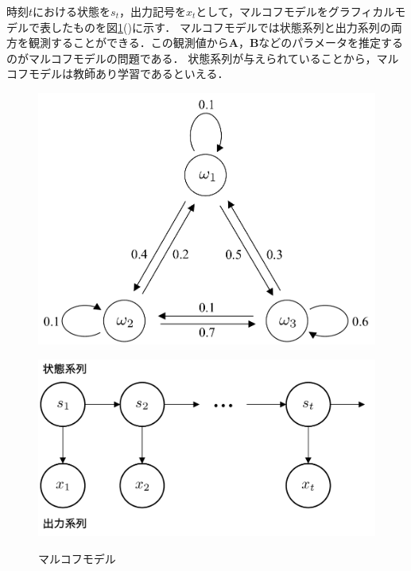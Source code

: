 \documentclass[a4j]{jarticle}
\begin{document}
時刻$t$における状態を$s_{t}$，出力記号を$x_{t}$として，マルコフモデルをグラフィカルモデルで表したものを図\ref{fig:markov:markovmodel}()に示す．
マルコフモデルでは状態系列と出力系列の両方を観測することができる．この観測値から$\bm{A}，\bm{B}$などのパラメータを推定するのがマルコフモデルの問題である．
状態系列が与えられていることから，マルコフモデルは教師あり学習であるといえる．

\begin{figure}[htb]
	\centering
	\begin{minipage}[t]{.49\hsize}
		\centering
		\includegraphics[width=\hsize, bb=0 0 461 344]{./fig/hidden_markov_model/markov_model.pdf}
		\label{fig:markov:markovmodel1}
	\end{minipage}
	\begin{minipage}[t]{.5\hsize}
		\centering
		\includegraphics[width=\hsize, bb=0 0 551 289]{./fig/hidden_markov_model/markov_graph.pdf}
		\label{fig:markov:markovmodel2}
	\end{minipage}
	\caption{マルコフモデル}
	\label{fig:markov:markovmodel}
\end{figure}
\end{document}

